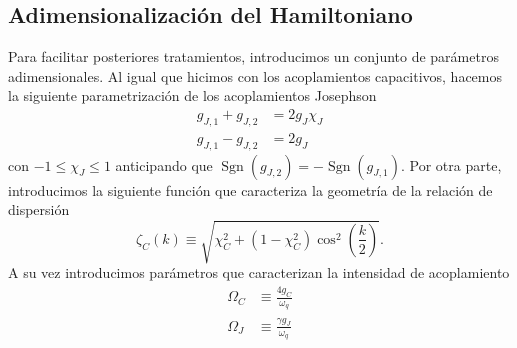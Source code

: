 \subsection{Adimensionalización del Hamiltoniano}
Para facilitar posteriores tratamientos, introducimos un conjunto de parámetros adimensionales. Al igual que hicimos con los acoplamientos capacitivos, hacemos la siguiente parametrización de los acoplamientos Josephson
\begin{subequations}
    \begin{align}
        g_{J,1} + g_{J,2} &= 2g_J \chi_J\\
        g_{J,1} - g_{J,2} &= 2g_J 
    \end{align}\label{eq:josephson_parametrization}
\end{subequations}
con $-1 \leq \chi_J \leq 1$ anticipando que $\operatorname{Sgn}(g_{J,2}) = - \operatorname{Sgn}(g_{J,1})$. Por otra parte, introducimos la siguiente función que caracteriza la geometría de la relación de dispersión
\begin{equation}
    \zeta_C(k) \equiv \sqrt{\chi_C^2 + (1-\chi_C^2) \cos^2(\frac{k}{2})}. 
\end{equation}
A su vez introducimos parámetros que caracterizan la intensidad de acoplamiento 
\begin{subequations}
    \begin{align}
        \Omega_C &\equiv \frac{4g_C}{\omega_q}\\
        \Omega_J &\equiv \frac{\gamma g_J}{\omega_q}
    \end{align}
\end{subequations}
